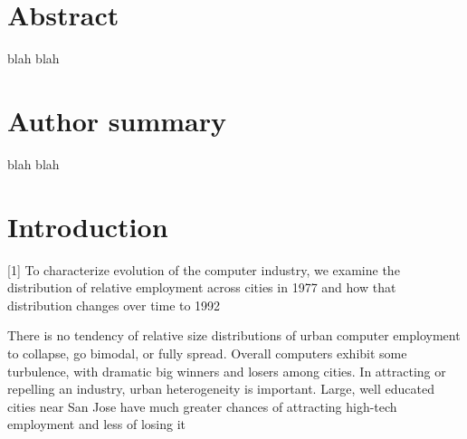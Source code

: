 \documentclass[10pt,letterpaper]{article}
\newcommand{\getIndex}[2]{
  \ForEach{,}{\IfEq{#1}{\thislevelitem}{\number\thislevelcount\ExitForEach}{}}{#2}
}
\newcommand{\getAff}[1]{
  \getIndex{#1}{University of Bristol and The Alan Turing Institute}
}
\begin{document}
\vspace*{0.2in}

\section*{Abstract}
blah blah

\section*{Author summary}
blah blah

\linenumbers

\hypertarget{sec:1}{%
\section{Introduction}\label{sec:1}}

{[}1{]} To characterize evolution of the computer industry, we examine
the distribution of relative employment across cities in 1977 and how
that distribution changes over time to 1992

There is no tendency of relative size distributions of urban computer
employment to collapse, go bimodal, or fully spread. Overall computers
exhibit some turbulence, with dramatic big winners and losers among
cities. In attracting or repelling an industry, urban heterogeneity is
important. Large, well educated cities near San Jose have much greater
chances of attracting high-tech employment and less of losing it
\end{document}
